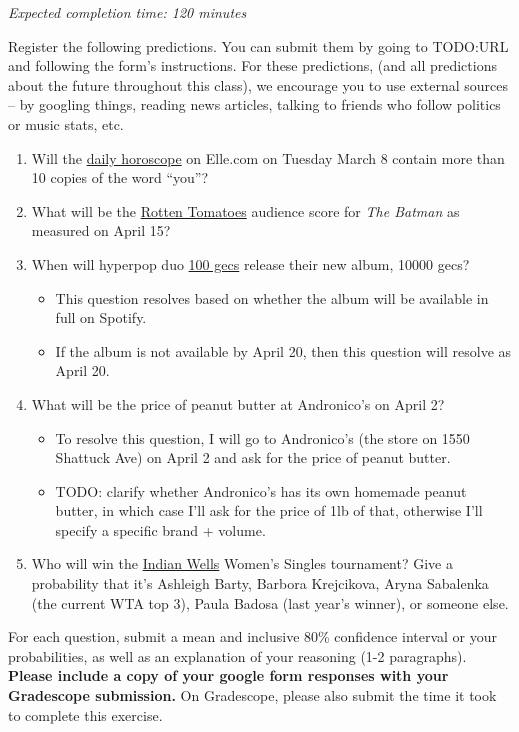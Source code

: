 \documentclass[11pt]{article}
\begin{document}
\emph{Expected completion time: 120 minutes}

Register the following predictions. You can submit them by going to TODO:URL and following the form's instructions. For these predictions, (and all predictions about the future throughout this class), we encourage you to use external sources -- by googling things, reading news articles, talking to friends who follow politics or music stats, etc.

\begin{enumerate}
	\item Will the \href{https://www.elle.com/horoscopes/daily/a107/aquarius-daily-horoscope/}{daily horoscope} on Elle.com on Tuesday March 8 contain more than 10 copies of the word ``you''?
	\item What will be the \href{https://www.rottentomatoes.com/m/the_batman}{Rotten Tomatoes} audience score for \emph{The Batman} as measured on April 15?
	\item When will hyperpop duo \href{https://en.wikipedia.org/wiki/100_Gecs}{100 gecs} release their new album, 10000 gecs?
	\begin{itemize}
		\item This question resolves based on whether the album will be available in full on Spotify.
		\item If the album is not available by April 20, then this question will resolve as April 20.
	\end{itemize}
	\item What will be the price of peanut butter at Andronico's on April 2?
	\begin{itemize}
		\item To resolve this question, I will go to Andronico's (the store on 1550 Shattuck Ave) on April 2 and ask for the price of peanut butter.
		\item TODO: clarify whether Andronico's has its own homemade peanut butter, in which case I'll ask for the price of 1lb of that, otherwise I'll specify a specific brand + volume.
	\end{itemize}
	\item Who will win the \href{https://bnpparibasopen.com/players/current/?assoc=wta&type=singles}{Indian Wells} Women's Singles tournament? Give a probability that it's Ashleigh Barty, Barbora Krejcikova, Aryna Sabalenka (the current WTA top 3), Paula Badosa (last year's winner), or someone else.
\end{enumerate}

For each question, submit a mean and inclusive 80\% confidence interval or your probabilities, as well as an explanation of your reasoning (1-2 paragraphs). \textbf{Please include a copy of your google form responses with your Gradescope submission.} On Gradescope, please also submit the time it took to complete this exercise.
\end{document}

